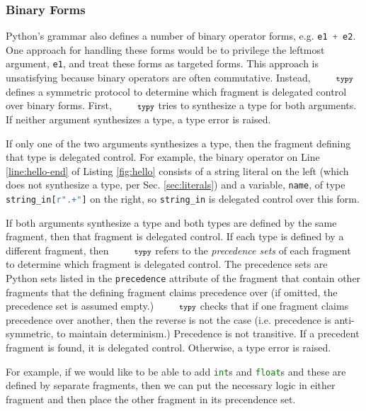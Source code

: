 \documentclass[10pt]{sigplanconf}
\newcommand{\typy}{\texttt{\footnotesize typy}}
\newcommand{\lip}[1]{\lstinline[language=Python,basicstyle=\ttfamily\footnotesize,morekeywords={with},deletendkeywords={tuple,buffer,map}]{#1}}
\newcommand{\li}[1]{\lip{#1}}
\begin{document}
\subsubsection{Binary Forms}\label{sec:binary-forms}

Python's grammar also defines a number of binary operator forms, e.g. \li{e1 + e2}. One approach for handling these forms would be to privilege the leftmost argument, \li{e1}, and treat these forms as targeted forms. This approach is unsatisfying because binary operators are often commutative. Instead, $\typy$ defines a symmetric protocol to determine which fragment is delegated control over binary forms. First, $\typy$ tries to synthesize a type for both arguments.
If neither argument synthesizes a type, a type error is raised. 

If only one of the two arguments synthesizes a type, then the fragment defining that type is delegated control. For example, the binary operator on Line \ref{line:hello-end} of Listing \ref{fig:hello} consists of a string literal on the left (which does not synthesize a type, per Sec. \ref{sec:literals}) and a variable, \li{name}, of type \li{string_in[r".+"]} on the right, so \li{string_in} is delegated control over this form.

If both arguments synthesize a type and both types are defined by the same fragment, then that fragment is delegated control. If each type is defined by a different fragment, then $\typy$ refers to the \emph{precedence sets} of each fragment to determine which fragment is delegated control. The precedence sets are Python sets listed in the \li{precedence} attribute of the fragment that contain other fragments that the defining fragment claims precedence over (if omitted, the precedence set is assumed empty.) $\typy$ checks that if one fragment claims precedence over another, then the reverse is not the case (i.e. precedence is anti-symmetric, to maintain determinism.) Precedence is not transitive. If a precedent fragment is found, it is delegated control. Otherwise, a type error is raised.%

For example, if we would like to be able to add \li{int}s and \li{float}s and these are defined by separate fragments, then we can put the necessary logic in either fragment and then place the other fragment in its precendence set.

\end{document}
